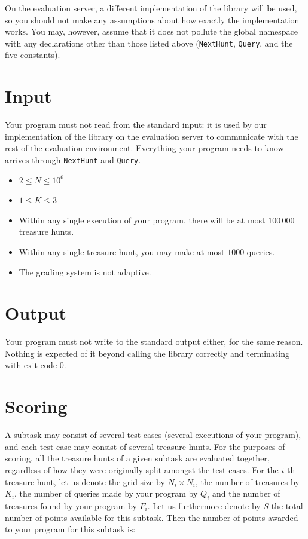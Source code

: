On the evaluation server, a different implementation of the library will be used,
so you should not make any assumptions about how exactly the implementation
works. You may, however, assume that it does not pollute the global namespace
with any declarations other than those listed above (\texttt{NextHunt},
\texttt{Query}, and the five constants).

\section*{Input}
Your program must not read from the standard input: it is used by our
implementation of the library on the evaluation server to communicate with the
rest of the evaluation environment. Everything your program needs to know arrives
through \texttt{NextHunt} and \texttt{Query}.

\begin{itemize}
  \item $2 \leq N \leq 10^6$
  \item $1 \leq K \leq 3$
  \item Within any single execution of your program, there will be at most
        $100\,000$ treasure hunts.
  \item Within any single treasure hunt, you may make at most $1000$ queries.
  \item The grading system is not adaptive.
\end{itemize}

\section*{Output}
Your program must not write to the standard output either, for the same reason.
Nothing is expected of it beyond calling the library correctly and terminating
with exit code $0$.

\section*{Scoring}
A subtask may consist of several test cases (several executions of your program),
and each test case may consist of several treasure hunts. For the purposes of
scoring, all the treasure hunts of a given subtask are evaluated together,
regardless of how they were originally split amongst the test cases. For the
$i$-th treasure hunt, let us denote the grid size by $N_i \times N_i$, the number
of treasures by $K_i$, the number of queries made by your program by $Q_i$ and
the number of treasures found by your program by $F_i$. Let us furthermore denote
by $S$ the total number of points available for this subtask. Then the number of
points awarded to your program for this subtask is:

